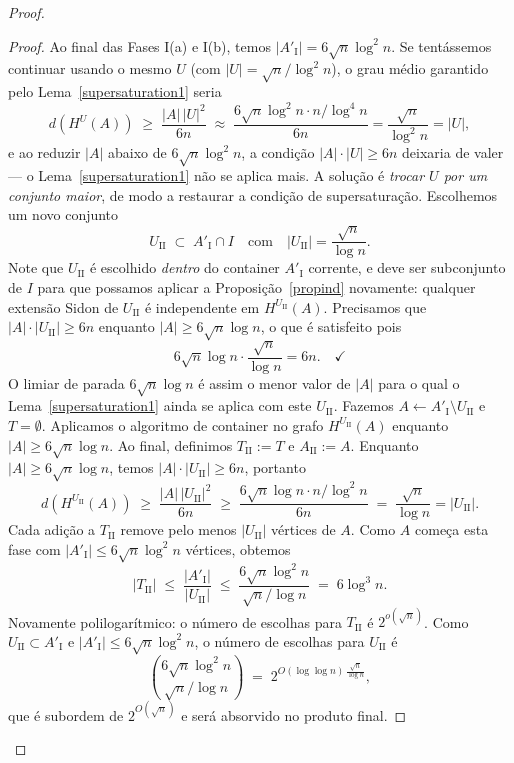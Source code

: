 \documentclass[reqno,a4paper,12pt]{amsart}
\begin{document}
\begin{proof}
\begin{proof}
    Ao final das Fases I(a) e I(b), temos $|A'_{\mathrm{I}}| = 6\sqrt{n}\log^2 n$. Se tentássemos
    continuar usando o mesmo $U$ (com $|U| = \sqrt{n}/\log^2 n$), o grau médio garantido pelo
    Lema~\ref{supersaturation1} seria
    \[
      d(H^U(A)) \;\geq\; \frac{|A|\,|U|^2}{6n}
      \;\approx\; \frac{6\sqrt{n}\log^2 n \cdot n/\log^4 n}{6n} = \frac{\sqrt{n}}{\log^2 n} = |U|,
    \]
    e ao reduzir $|A|$ abaixo de $6\sqrt{n}\log^2 n$, a condição $|A|\cdot|U| \geq 6n$ deixaria de
    valer --- o Lema~\ref{supersaturation1} não se aplica mais. A solução é \emph{trocar $U$ por um conjunto maior},
    de modo a restaurar a condição de supersaturação. Escolhemos um novo conjunto
    \[
      U_{\mathrm{II}} \;\subset\; A'_{\mathrm{I}} \cap I
      \quad \text{com} \quad
      |U_{\mathrm{II}}| = \frac{\sqrt{n}}{\log n}.
    \]
    Note que $U_{\mathrm{II}}$ é escolhido \emph{dentro} do container $A'_{\mathrm{I}}$ corrente, e
    deve ser subconjunto de $I$ para que possamos aplicar a Proposição~\ref{propind} novamente: qualquer
    extensão Sidon de $U_{\mathrm{II}}$ é independente em $H^{U_{\mathrm{II}}}(A)$.
    Precisamos que $|A| \cdot |U_{\mathrm{II}}| \geq 6n$ enquanto $|A| \geq 6\sqrt{n}\log n$, o que
    é satisfeito pois
    \[
      6\sqrt{n}\log n \cdot \frac{\sqrt{n}}{\log n} = 6n. \quad \checkmark
    \]
    O limiar de parada $6\sqrt{n}\log n$ é assim o menor valor de $|A|$ para o qual o Lema~\ref{supersaturation1}
    ainda se aplica com este $U_{\mathrm{II}}$.
    Fazemos $A \leftarrow A'_{\mathrm{I}} \setminus U_{\mathrm{II}}$ e $T = \emptyset$. Aplicamos o
    algoritmo de container no grafo $H^{U_{\mathrm{II}}}(A)$ enquanto $|A| \geq 6\sqrt{n}\log n$.
    Ao final, definimos $T_{\mathrm{II}} := T$ e $A_{\mathrm{II}} := A$.
    Enquanto $|A| \geq 6\sqrt{n}\log n$, temos $|A|\cdot|U_{\mathrm{II}}| \geq 6n$, portanto
    \[
      d(H^{U_{\mathrm{II}}}(A)) \;\geq\; \frac{|A|\,|U_{\mathrm{II}}|^2}{6n}
      \;\geq\; \frac{6\sqrt{n}\log n \cdot n/\log^2 n}{6n}
      \;=\; \frac{\sqrt{n}}{\log n} = |U_{\mathrm{II}}|.
    \]
    Cada adição a $T_{\mathrm{II}}$ remove pelo menos $|U_{\mathrm{II}}|$ vértices de $A$. Como $A$
    começa esta fase com $|A'_{\mathrm{I}}| \leq 6\sqrt{n}\log^2 n$ vértices, obtemos
    \[
      |T_{\mathrm{II}}| \;\leq\; \frac{|A'_{\mathrm{I}}|}{|U_{\mathrm{II}}|}
      \;\leq\; \frac{6\sqrt{n}\log^2 n}{\sqrt{n}/\log n}
      \;=\; 6\log^3 n.
    \]
    Novamente polilogarítmico: o número de escolhas para $T_{\mathrm{II}}$ é $2^{o(\sqrt{n})}$.
    Como $U_{\mathrm{II}} \subset A'_{\mathrm{I}}$ e $|A'_{\mathrm{I}}| \leq 6\sqrt{n}\log^2 n$, o
    número de escolhas para $U_{\mathrm{II}}$ é
    \[
      \binom{6\sqrt{n}\log^2 n}{\sqrt{n}/\log n}
      \;=\; 2^{O(\log\log n)\,\frac{\sqrt{n}}{\log n}},
    \]
    que é subordem de $2^{O(\sqrt{n})}$ e será absorvido no produto final.


\end{proof}
\end{proof}
\end{document}
